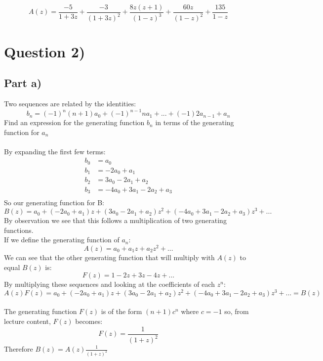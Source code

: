 \documentclass{article}
\begin{document}
\[ A(z) = \frac{-5}{1+3z} + \frac{-3}{(1+3z)^2} + \frac{8z(z+1)}{(1-z)^3} + \frac{60z}{(1-z)^2} + \frac{135}{1-z} \]


\section{Question 2)}
\subsection{Part a)}
Two sequences are related by the identities:
\[ b_n = (-1)^n (n+1)a_0 + (-1)^{n-1}n a_1 + ... + (-1)2 a_{n-1} + a_n \]
Find an expression for the generating function $b_n$ in terms of the generating function for $a_n$
\\
\\
By expanding the first few terms:
\begin{align*}
  b_0 &= a_0 \\
  b_1 &= -2a_0 + a_1 \\
  b_2 &= 3a_0 - 2a_1 + a_2 \\
  b_3 &= -4a_0 + 3a_1 - 2a_2 + a_3 \\
\end{align*}
So our generating function for B:
\[ B(z) = a_0 + (-2a_0 + a_1)z + (3a_0 - 2a_1 + a_2)z^2 + (-4a_0 + 3a_1 - 2a_2 + a_3)z^3 + ... \]
By observation we see that this follows a multiplication of two generating functions.
\\
If we define the generating function of $a_n$:
\[ A(z) = a_0 + a_1 z + a_2 z^2 + ... \]
We can see that the other generating function that will multiply with $A(z)$ to equal $B(z)$ is:
\[ F(z) = 1 -2z + 3z -4z + ... \]
By multiplying these sequences and looking at the coefficients of each $z^n$:
\[ A(z)F(z) = a_0 + (-2a_0 + a_1)z + (3a_0 - 2a_1 + a_2)z^2 + (-4a_0 + 3a_1 - 2a_2 + a_3)z^3 + ... = B(z) \]
\\
The generating function $F(z)$ is of the form $(n+1)c^n$ where $c = -1$ so, from lecture content, $F(z)$ becomes:
\[ F(z) = \frac{1}{(1+z)^2} \]
Therefore $B(z) = A(z)\frac{1}{(1+z)^2}$
\end{document}
